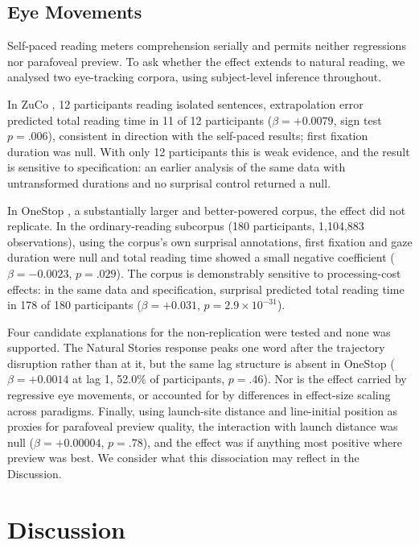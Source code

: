 \documentclass[12pt]{article}
\newcommand{\new}[1]{{\bfseries #1}}
\begin{document}
\new{\subsection{Eye Movements}

Self-paced reading meters comprehension serially and permits neither regressions nor parafoveal preview. To ask whether the effect extends to natural reading, we analysed two eye-tracking corpora, using subject-level inference throughout.

In ZuCo \citep{hollenstein2018}, 12 participants reading isolated sentences, extrapolation error predicted total reading time in 11 of 12 participants ($\beta = +0.0079$, sign test $p = .006$), consistent in direction with the self-paced results; first fixation duration was null. With only 12 participants this is weak evidence, and the result is sensitive to specification: an earlier analysis of the same data with untransformed durations and no surprisal control returned a null.

In OneStop \citep{berzak2025}, a substantially larger and better-powered corpus, the effect did not replicate. In the ordinary-reading subcorpus (180 participants, 1,104,883 observations), using the corpus's own surprisal annotations, first fixation and gaze duration were null and total reading time showed a small negative coefficient ($\beta = -0.0023$, $p = .029$). The corpus is demonstrably sensitive to processing-cost effects: in the same data and specification, surprisal predicted total reading time in 178 of 180 participants ($\beta = +0.031$, $p = 2.9 \times 10^{-31}$).

Four candidate explanations for the non-replication were tested and none was supported. The Natural Stories response peaks one word after the trajectory disruption rather than at it, but the same lag structure is absent in OneStop ($\beta = +0.0014$ at lag 1, 52.0\% of participants, $p = .46$). Nor is the effect carried by regressive eye movements, or accounted for by differences in effect-size scaling across paradigms. Finally, using launch-site distance and line-initial position as proxies for parafoveal preview quality, the interaction with launch distance was null ($\beta = +0.00004$, $p = .78$), and the effect was if anything most positive where preview was best. We consider what this dissociation may reflect in the Discussion.}

\FloatBarrier

\section{Discussion}
\end{document}

